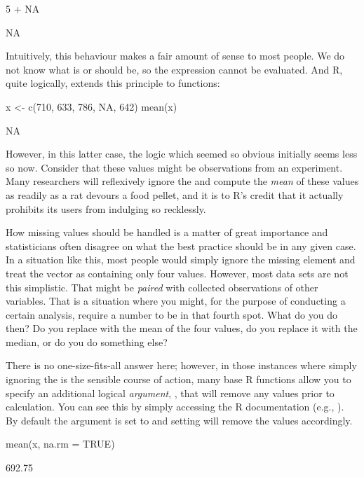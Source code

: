 \begin{inR}
5 + NA
\end{inR}
\begin{outR}
[1] NA
\end{outR}

Intuitively, this behaviour makes a fair amount of sense to most people.  We do not know what  is or should be, so the expression  cannot be evaluated. And R, quite logically, extends this principle to functions:

\begin{inR}
x <- c(710, 633, 786, NA, 642)
mean(x)
\end{inR}
\begin{outR}
[1] NA
\end{outR}

However, in this latter case, the logic which seemed so obvious initially seems less so now.  Consider that these values might be observations from an experiment.  Many researchers will reflexively ignore the  and compute the \textit{mean} of these values as readily as a rat devours a food pellet, and it is to R's credit that it actually prohibits its users from indulging so recklessly.

How missing values should be handled is a matter of great importance and statisticians often disagree on what the best practice should be in any given case. In a situation like this, most people would simply ignore the missing element and treat the vector as containing only four values. However, most data sets are not this simplistic.  That  might be \textit{paired} with collected observations of other variables. That is a situation where you might, for the purpose of conducting a certain analysis, require a number to be in that fourth spot. What do you do then? Do you replace  with the mean of the four values, do you replace it with the median, or do you do something else?

There is no one-size-fits-all answer here; however, in those instances where simply ignoring the  is the sensible course of action, many base R functions allow you to specify an additional logical \textit{argument}, , that will remove any  values prior to calculation. You can see this by simply accessing the R documentation (e.g., ). By default the argument is set to  and setting  will remove the  values accordingly.

\begin{inR}
mean(x, na.rm = TRUE)
\end{inR}
\begin{outR}
[1] 692.75
\end{outR}

